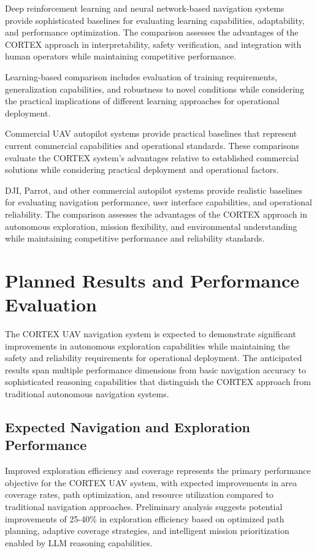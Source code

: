 Deep reinforcement learning and neural network-based navigation systems provide sophisticated baselines for evaluating learning capabilities, adaptability, and performance optimization. The comparison assesses the advantages of the CORTEX approach in interpretability, safety verification, and integration with human operators while maintaining competitive performance.

Learning-based comparison includes evaluation of training requirements, generalization capabilities, and robustness to novel conditions while considering the practical implications of different learning approaches for operational deployment.

Commercial UAV autopilot systems provide practical baselines that represent current commercial capabilities and operational standards. These comparisons evaluate the CORTEX system's advantages relative to established commercial solutions while considering practical deployment and operational factors.

DJI, Parrot, and other commercial autopilot systems provide realistic baselines for evaluating navigation performance, user interface capabilities, and operational reliability. The comparison assesses the advantages of the CORTEX approach in autonomous exploration, mission flexibility, and environmental understanding while maintaining competitive performance and reliability standards.

\section{Planned Results and Performance Evaluation}

The CORTEX UAV navigation system is expected to demonstrate significant improvements in autonomous exploration capabilities while maintaining the safety and reliability requirements for operational deployment. The anticipated results span multiple performance dimensions from basic navigation accuracy to sophisticated reasoning capabilities that distinguish the CORTEX approach from traditional autonomous navigation systems.

\subsection{Expected Navigation and Exploration Performance}

Improved exploration efficiency and coverage represents the primary performance objective for the CORTEX UAV system, with expected improvements in area coverage rates, path optimization, and resource utilization compared to traditional navigation approaches. Preliminary analysis suggests potential improvements of 25-40\% in exploration efficiency based on optimized path planning, adaptive coverage strategies, and intelligent mission prioritization enabled by LLM reasoning capabilities.

